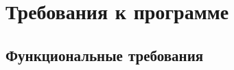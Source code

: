 \section{Требования к программе}

\subsection{Функциональные требования}

\headingtextsep

\underline{\hspace{\textwidth}}

\underline{\hspace{\textwidth}}

\subsubsection{\underline{\hspace{8cm}}}

\underline{\hspace{\textwidth}}

\underline{\hspace{\textwidth}}

\subsubsection{\underline{\hspace{8cm}}}

\underline{\hspace{\textwidth}}

\underline{\hspace{\textwidth}}

\subsubsection{\underline{\hspace{8cm}}}

\underline{\hspace{\textwidth}}

\underline{\hspace{\textwidth}}

\subsubsection{\underline{\hspace{8cm}}}

\underline{\hspace{\textwidth}}

